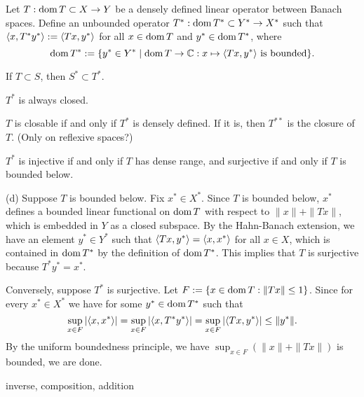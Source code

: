 \documentclass{../../large}
\begin{document}
\begin{prb}
Let $T:\operatorname{dom} T\subset X\to Y$ be a densely defined linear operator between Banach spaces.
Define an unbounded operator $T^*:\operatorname{dom} T^*\subset Y^*\to X^*$ such that $\langle x,T^*y^*\rangle:=\langle Tx,y^*\rangle$ for all $x\in\operatorname{dom} T$ and $y^*\in\operatorname{dom} T^*$, where
\[\operatorname{dom} T^*:=\{y^*\in Y^*\mid \operatorname{dom} T\to\mathbb{C}:x\mapsto\langle Tx,y^*\rangle\text{ is bounded}\}.\]
\begin{parts}
\item If $T\subset S$, then $S^*\subset T^*$.
\item $T^*$ is always closed.
\item $T$ is closable if and only if $T^*$ is densely defined. If it is, then $T^{**}$ is the closure of $T$. (Only on reflexive spaces?)
\item $T^*$ is injective if and only if $T$ has dense range, and surjective if and only if $T$ is bounded below.
\end{parts}
\end{prb}
\begin{pf}

(d)
Suppose $T$ is bounded below.
Fix $x^*\in X^*$.
Since $T$ is bounded below, $x^*$ defines a bounded linear functional on $\operatorname{dom} T$ with respect to $\|x\|+\|Tx\|$, which is embedded in $Y$ as a closed subspace.
By the Hahn-Banach extension, we have an element $y^*\in Y^*$ such that $\langle Tx,y^*\rangle=\langle x,x^*\rangle$ for all $x\in X$, which is contained in $\operatorname{dom} T^*$ by the definition of $\operatorname{dom} T^*$.
This implies that $T$ is surjective because $T^*y^*=x^*$.

Conversely, suppose $T^*$ is surjective.
Let $F:=\{x\in\operatorname{dom} T:\|Tx\|\le1\}$.
Since for every $x^*\in X^*$ we have for some $y^*\in\operatorname{dom} T^*$ such that
\[\sup_{x\in F}|\langle x,x^*\rangle|=\sup_{x\in F}|\langle x,T^*y^*\rangle|=\sup_{x\in F}|\langle Tx,y^*\rangle|\le\|y^*\|.\]
By the uniform boundedness principle, we have $\sup_{x\in F}(\|x\|+\|Tx\|)$ is bounded, we are done.
\end{pf}

\begin{prb}
inverse, composition, addition
\end{prb}
\end{document}
